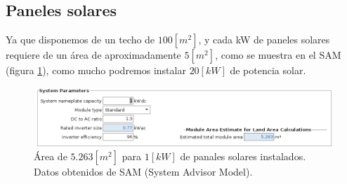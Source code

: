 \subsection{Paneles solares}

Ya que disponemos de un techo de $100[m^2]$, y cada kW de paneles solares
requiere de un área de aproximadamente $5[m^2]$, como se muestra en el SAM
(figura \ref{fig:solar_panel_area}), como mucho podremos instalar $20[kW]$ de
potencia solar.

\begin{figure}[h] \centering
	\centering
	\includegraphics[width=1\textwidth]{./capitulos/resultados_discusion/images/solar_panel_area.png}
	\caption{Área de $5.263[m^2]$ para $1[kW]$ de panales solares instalados. Datos obtenidos de SAM (System Advisor Model).}
	\label{fig:solar_panel_area}
\end{figure}
